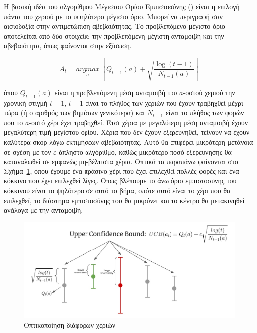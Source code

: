 Η βασική ιδέα του αλγορίθμου Μέγιστου Ορίου Εμπιστοσύνης () είναι η επιλογή πάντα του χεριού με το υψηλότερο μέγιστο όριο. Μπορεί να περιγραφή σαν αισιοδοξία στην αντιμετώπιση αβεβαιότητας. Το προβλεπόμενο μέγιστο όριο αποτελείται από δύο στοιχεία: την προβλεπόμενη μέγιστη ανταμοιβή και την αβεβαιότητα, όπως φαίνονται στην εξίσωση.

\begin{equation}
    A_t = \underset{a}{argmax}\;\left[Q_{t-1}(a) + \sqrt{\frac{\log{(t-1)}}{N_{t-1}(a)}}\right]
\end{equation}

όπου $Q_{t-1}(a)$ είναι η προβλεπόμενη μέση ανταμοιβή του $a$-οστού χεριού την χρονική στιγμή $t-1$, $t-1$ είναι το πλήθος των χεριών που έχουν τραβηχθεί μέχρι τώρα (ή ο αριθμός των βημάτων γενικότερα) και $N_{t-1}$ είναι το πλήθος των φορών που το $a$-οστό χέρι έχει τραβηχθεί. Έτσι χέρια με μεγαλύτερη μέση ανταμοιβή έχουν μεγαλύτερη τιμή μεγίστου ορίου. Χέρια που δεν έχουν εξερευνηθεί, τείνουν να έχουν καλύτερα σκορ λόγω εκτιμήσεων αβεβαιότητας. Αυτό θα επιφέρει μικρότερη μετάνοια σε σχέση με τον $ε$-άπληστο αλγόριθμο, καθώς μικρότερο ποσό εξερευνησης θα καταναλωθεί σε εμφανώς μη-βέλτιστα χέρια. Οπτικά τα παραπάνω φαίνονται στο Σχήμα~\ref{fig:ucb}, όπου έχουμε ένα πράσινο χέρι που έχει επιλεχθεί πολλές φορές και ένα κόκκινο που έχει επιλεχθεί λίγες. Όπως βλέπουμε το άνω όριο εμπιστοσυνης του κόκκινου είναι το ψηλότερο σε αυτό το βήμα, οπότε αυτό είναι το χέρι που θα επιλεχθεί, το διάστημα εμπιστοσύνης του θα μικρύνει και το κέντρο θα μετακινηθεί ανάλογα με την ανταμοιβή.

\begin{figure}
    \centering
    \includegraphics[width=\textwidth]{body_matter/bandits/images/ucb.jpg}
    \caption{Οπτικοποίηση  \cite{yan2022bandit} διάφορων χεριών}
    \label{fig:ucb}
\end{figure}

